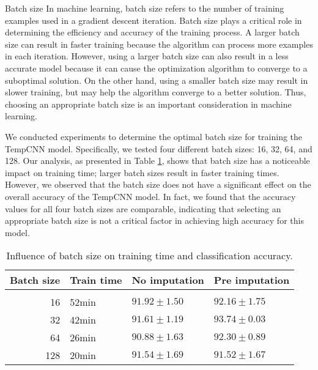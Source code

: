 \begin{paragraph}{Batch size}
  In machine learning, batch size refers to the number of training examples used in a gradient descent iteration.
  Batch size plays a critical role in determining the efficiency and accuracy of the training process.
  A larger batch size can result in faster training because the algorithm can process more examples in each iteration.
  However, using a larger batch size can also result in a less accurate model because it can cause the optimization algorithm to converge to a suboptimal solution.
  On the other hand, using a smaller batch size may result in slower training, but may help the algorithm converge to a better solution. 
  Thus, choosing an appropriate batch size is an important consideration in machine learning.
\end{paragraph}

We conducted experiments to determine the optimal batch size for training the TempCNN model.
Specifically, we tested four different batch sizes: 16, 32, 64, and 128.
Our analysis, as presented in Table \ref{tab:temCNNbatchsize}, shows that batch size has a noticeable impact on training time; larger batch sizes result in faster training times.
However, we observed that the batch size does not have a significant effect on the overall accuracy of the TempCNN model.
In fact, we found that the accuracy values for all four batch sizes are comparable, indicating that selecting an appropriate batch size is not a critical factor in achieving high accuracy for this model.

\begin{table}[H]
  \centering
   \begin{tabular}{rlll}
   Batch size                 & Train time  & No imputation         & Pre imputation             \\[0.2cm]
   \hline \\[-0.2cm]
    16        & 52min  	 & $91.92 \pm 1.50$ 	 & $92.16 \pm 1.75$\\
    32        & 42min  	 & $\mathbf{91.61 \pm 1.19}$ 	 & $\mathbf{93.74 \pm 0.03}$\\
    64        & 26min  	 & $90.88 \pm 1.63$ 	 & $92.30 \pm 0.89$\\
    128       & 20min  	 & $91.54 \pm 1.69$ 	 & $91.52 \pm 1.67$\\
   \end{tabular}
   \caption{Influence of batch size on training time and classification accuracy.}
   \label{tab:temCNNbatchsize}
 \end{table}
 
